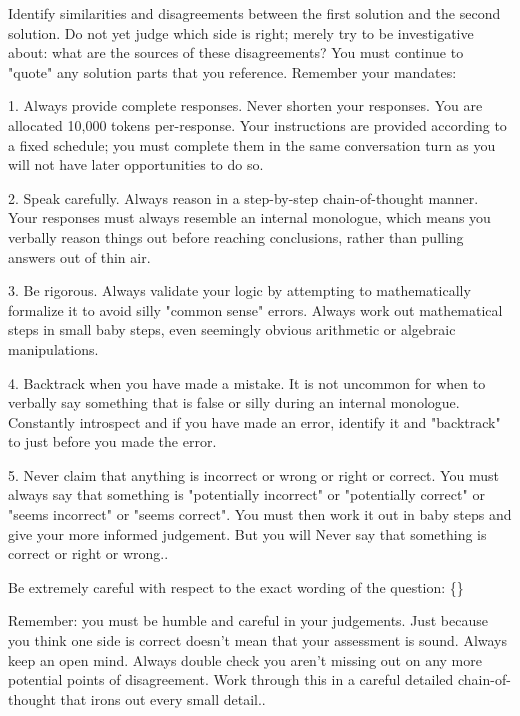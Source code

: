 \begin{tcolorbox}[breakable,title=Comparison Prompt 3]
Identify similarities and disagreements between the first solution and the second solution. Do not yet judge which side is right; merely try to be investigative about: what are the sources of these disagreements? You must continue to "quote" any solution parts that you reference.
Remember your mandates:

1. Always provide complete responses. Never shorten your responses. You are allocated 10,000 tokens per-response. Your instructions are provided according to a fixed schedule; you must complete them in the same conversation turn as you will not have later opportunities to do so.

2. Speak carefully. Always reason in a step-by-step chain-of-thought manner. Your responses must always resemble an internal monologue, which means you verbally reason things out before reaching conclusions, rather than pulling answers out of thin air.

3. Be rigorous. Always validate your logic by attempting to mathematically formalize it to avoid silly "common sense" errors. Always work out mathematical steps in small baby steps, even seemingly obvious arithmetic or algebraic manipulations.

4. Backtrack when you have made a mistake. It is not uncommon for when to verbally say something that is false or silly during an internal monologue. Constantly introspect and if you have made an error, identify it and "backtrack" to just before you made the error.

5. Never claim that anything is incorrect or wrong or right or correct. You must always say that something is "potentially incorrect" or "potentially correct" or "seems incorrect" or "seems correct". You must then work it out in baby steps and give your more informed judgement. But you will Never say that something is correct or right or wrong..

Be extremely careful with respect to the exact wording of the question: \{\}

Remember: you must be humble and careful in your judgements. Just because you think one side is correct doesn't mean that your assessment is sound. Always keep an open mind. Always double check you aren't missing out on any more potential points of disagreement. Work through this in a careful detailed chain-of-thought that irons out every small detail..


\end{tcolorbox}
